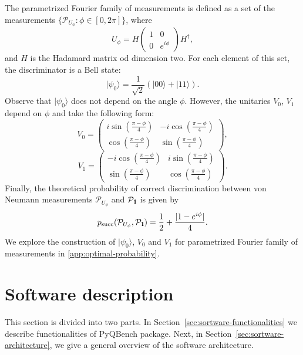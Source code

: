 \documentclass[preprint,12pt, a4paper, dvipsnames]{elsarticle}
\newcommand{\ket}[1]{\ensuremath{|#1\rangle}}
\newcommand{\1}{{\rm 1\hspace{-0.9mm}l}}
\newcommand{\Id}{{\rm 1\hspace{-0.9mm}l}}
\newcommand{\PP}{\mathcal{P}}
\theoremstyle{definition}
\begin{document}
The parametrized Fourier family of measurements is defined as a set of the measurements
$\{\PP_{U_\phi}\colon \phi \in [0, 2\pi]\}$, where 
\begin{equation}
U_\phi = H
\left(\begin{array}{cc}1&0\\0&e^{i \phi}\end{array}\right)  H^\dagger,
\end{equation}
and $H$ is the Hadamard matrix od dimension two. For each element of this set, the discriminator is a Bell state:
\begin{equation}
\ket{\psi_{0}} = \frac{1}{\sqrt{2}} \left( \ket{00} + \ket{11} \right).
\end{equation}
Observe that $\ket{\psi_0}$ does not depend on the angle $\phi$. However, the unitaries $V_0$,
$V_1$ depend on $\phi$ and take the following form:
\begin{equation}
V_0 = \left(\begin{array}{cc}i \sin\left( \frac{\pi - \phi}{4} \right)&-i
\cos\left( \frac{\pi - \phi}{4} \right)\\ \cos\left( \frac{\pi -
	\phi}{4}\right)& \sin\left( \frac{\pi - \phi}{4} \right)\end{array}\right),
\end{equation}
\begin{equation}
V_1 = \left(\begin{array}{cc}-i \cos\left(\frac{\pi - \phi}{4}\right) &i
\sin\left( \frac{\pi - \phi}{4}\right)\\\sin\left( \frac{\pi - \phi}{4} \right)
&  \cos\left( \frac{\pi - \phi}{4} \right) \end{array}\right).
\end{equation}
Finally, the theoretical probability of correct discrimination between von Neumann
measurements $\PP_{U_\phi}$ and $\PP_{\Id}$ is given by
\begin{equation}
p_{\text{succ}}(\PP_{U_\phi}, \PP_{\Id}) = \frac{1}{2} + \frac{|1 - e^{i \phi}  |}{4} .
\end{equation}
We explore the construction of $\ket{\psi_0}$, $V_0$ and $V_1$ for parametrized Fourier family of measurements in
\ref{app:optimal-probability}.

 \section{Software description}
 \label{}
 This section is divided into two parts.
 In Section~\ref{sec:sortware-functionalities} we describe functionalities of PyQBench
 package. Next, in Section~\ref{sec:sortware-architecture}, we give a general overview of the
 software architecture.
\end{document}
